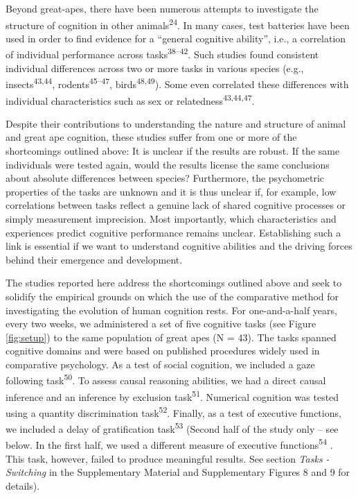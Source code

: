 \documentclass[
  man,floatsintext]{apa6}
\begin{document}
Beyond great-apes, there have been numerous attempts to investigate the structure of cognition in other animals\textsuperscript{24}. In many cases, test batteries have been used in order to find evidence for a ``general cognitive ability'', i.e., a correlation of individual performance across tasks\textsuperscript{38--42}. Such studies found consistent individual differences across two or more tasks in various species (e.g., insects\textsuperscript{43,44}, rodents\textsuperscript{45--47}, birds\textsuperscript{48,49}). Some even correlated these differences with individual characteristics such as sex or relatedness\textsuperscript{43,44,47}.

Despite their contributions to understanding the nature and structure of animal and great ape cognition, these studies suffer from one or more of the shortcomings outlined above: It is unclear if the results are robust. If the same individuals were tested again, would the results license the same conclusions about absolute differences between species? Furthermore, the psychometric properties of the tasks are unknown and it is thus unclear if, for example, low correlations between tasks reflect a genuine lack of shared cognitive processes or simply measurement imprecision. Most importantly, which characteristics and experiences predict cognitive performance remains unclear. Establishing such a link is essential if we want to understand cognitive abilities and the driving forces behind their emergence and development.

The studies reported here address the shortcomings outlined above and seek to solidify the empirical grounds on which the use of the comparative method for investigating the evolution of human cognition rests. For one-and-a-half years, every two weeks, we administered a set of five cognitive tasks (see Figure \ref{fig:setup}) to the same population of great apes (N = 43). The tasks spanned cognitive domains and were based on published procedures widely used in comparative psychology. As a test of social cognition, we included a gaze following task\textsuperscript{50}. To assess causal reasoning abilities, we had a direct causal inference and an inference by exclusion task\textsuperscript{51}. Numerical cognition was tested using a quantity discrimination task\textsuperscript{52}. Finally, as a test of executive functions, we included a delay of gratification task\textsuperscript{53} (Second half of the study only -- see below. In the first half, we used a different measure of executive functions\textsuperscript{54} . This task, however, failed to produce meaningful results. See section \emph{Tasks - Switching} in the Supplementary Material and Supplementary Figures 8 and 9 for details).
\end{document}
